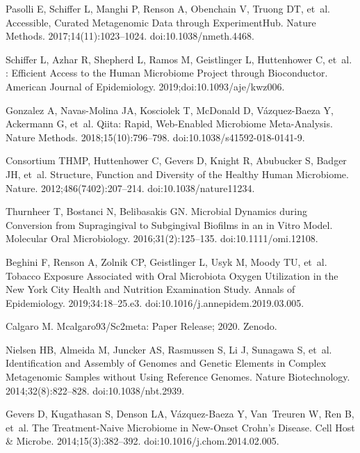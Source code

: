 \documentclass[10pt,letterpaper]{article}
\begin{document}
\begin{thebibliography}{10}
Pasolli E, Schiffer L, Manghi P, Renson A, Obenchain V, Truong DT, et~al.
\newblock Accessible, Curated Metagenomic Data through {{ExperimentHub}}.
\newblock Nature Methods. 2017;14(11):1023--1024.
\newblock doi:{10.1038/nmeth.4468}.

Schiffer L, Azhar R, Shepherd L, Ramos M, Geistlinger L, Huttenhower C, et~al.
: Efficient Access to the Human Microbiome Project
  through Bioconductor.
\newblock American Journal of Epidemiology. 2019;doi:{10.1093/aje/kwz006}.

Gonzalez A, {Navas-Molina} JA, Kosciolek T, McDonald D, {V{\'a}zquez-Baeza} Y,
  Ackermann G, et~al.
\newblock Qiita: Rapid, Web-Enabled Microbiome Meta-Analysis.
\newblock Nature Methods. 2018;15(10):796--798.
\newblock doi:{10.1038/s41592-018-0141-9}.

Consortium THMP, Huttenhower C, Gevers D, Knight R, Abubucker S, Badger JH,
  et~al.
\newblock Structure, Function and Diversity of the Healthy Human Microbiome.
\newblock Nature. 2012;486(7402):207--214.
\newblock doi:{10.1038/nature11234}.

Thurnheer T, Bostanci N, Belibasakis GN.
\newblock Microbial Dynamics during Conversion from Supragingival to
  Subgingival Biofilms in an in Vitro Model.
\newblock Molecular Oral Microbiology. 2016;31(2):125--135.
\newblock doi:{10.1111/omi.12108}.

Beghini F, Renson A, Zolnik CP, Geistlinger L, Usyk M, Moody TU, et~al.
\newblock Tobacco Exposure Associated with Oral Microbiota Oxygen Utilization
  in the {{New York City Health}} and {{Nutrition Examination Study}}.
\newblock Annals of Epidemiology. 2019;34:18--25.e3.
\newblock doi:{10.1016/j.annepidem.2019.03.005}.

Calgaro M. Mcalgaro93/Sc2meta: Paper {{Release}}; 2020.
\newblock Zenodo.

Nielsen HB, Almeida M, Juncker AS, Rasmussen S, Li J, Sunagawa S, et~al.
\newblock Identification and Assembly of Genomes and Genetic Elements in
  Complex Metagenomic Samples without Using Reference Genomes.
\newblock Nature Biotechnology. 2014;32(8):822--828.
\newblock doi:{10.1038/nbt.2939}.

Gevers D, Kugathasan S, Denson LA, {V{\'a}zquez-Baeza} Y, Van~Treuren W, Ren B,
  et~al.
\newblock The {{Treatment}}-{{Naive Microbiome}} in {{New}}-{{Onset Crohn}}'s
  {{Disease}}.
\newblock Cell Host \& Microbe. 2014;15(3):382--392.
\newblock doi:{10.1016/j.chom.2014.02.005}.


\end{thebibliography}
\end{document}
